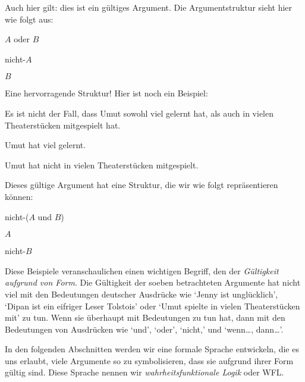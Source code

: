 Auch hier gilt: dies ist ein gültiges Argument. Die Argumentstruktur sieht hier wie folgt aus:
	\begin{earg}
		\item[] $A$ oder $B$
		\item[] nicht-$A$
		\item[\therefore] $B$
	\end{earg}
Eine hervorragende Struktur! Hier ist noch ein Beispiel:
	\begin{earg}
		\item[] Es ist nicht der Fall, dass Umut sowohl viel gelernt hat, als auch in vielen Theaterstücken mitgespielt hat.
		\item[] Umut hat viel gelernt.
		\item[\therefore] Umut hat nicht in vielen Theaterstücken mitgespielt.
	\end{earg}
Dieses gültige Argument hat eine Struktur, die wir wie folgt repräsentieren können:
	\begin{earg}
		\item[] nicht-($A$ und $B$)
		\item[] $A$
		\item[\therefore] nicht-$B$
	\end{earg}
Diese Beispiele veranschaulichen einen wichtigen Begriff, den der \emph{Gültigkeit aufgrund von Form}. Die Gültigkeit der soeben betrachteten Argumente hat nicht viel mit den Bedeutungen deutscher Ausdrücke wie `Jenny ist unglücklich', `Dipan ist ein eifriger Leser Tolstois' oder `Umut spielte in vielen Theaterstücken mit' zu tun. Wenn sie überhaupt mit Bedeutungen zu tun hat, dann mit den Bedeutungen von Ausdrücken wie `und', `oder', `nicht,' und `wenn\ldots, dann\ldots'. 

In den folgenden Abschnitten werden wir eine formale Sprache entwickeln, die es uns erlaubt, viele Argumente so zu symbolisieren, dass sie aufgrund ihrer Form gültig sind. Diese Sprache nennen wir \emph{wahrheitsfunktionale Logik} oder WFL.

